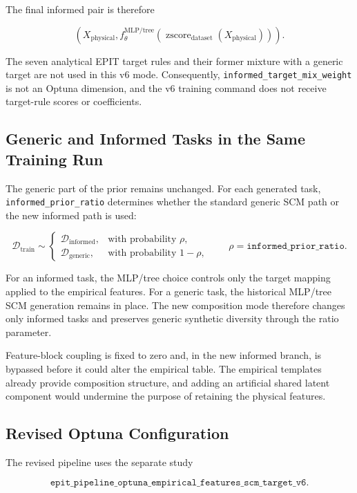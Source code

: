 \documentclass{article}
\begin{document}
The final informed pair is therefore

\[
\left(
X_{\mathrm{physical}},
f_{\theta}^{\mathrm{MLP/tree}}
\!\left(
\operatorname{zscore}_{\mathrm{dataset}}
(X_{\mathrm{physical}})
\right)
\right).
\]

The seven analytical EPIT target rules and their former mixture with a generic
target are not used in this v6 mode. Consequently,
\texttt{informed\_target\_mix\_weight} is not an Optuna dimension, and the
v6 training command does not receive target-rule scores or coefficients.

\subsection{Generic and Informed Tasks in the Same Training Run}

The generic part of the prior remains unchanged. For each generated task,
\texttt{informed\_prior\_ratio} determines whether the standard generic SCM
path or the new informed path is used:

\[
\mathcal{D}_{\mathrm{train}}
\sim
\begin{cases}
\mathcal{D}_{\mathrm{informed}},
& \text{with probability }\rho,\\
\mathcal{D}_{\mathrm{generic}},
& \text{with probability }1-\rho,
\end{cases}
\qquad
\rho
=
\texttt{informed\_prior\_ratio}.
\]

For an informed task, the MLP/tree choice controls only the target mapping
applied to the empirical features. For a generic task, the historical MLP/tree
SCM generation remains in place. The new composition mode therefore changes
only informed tasks and preserves generic synthetic diversity through the
ratio parameter.

Feature-block coupling is fixed to zero and, in the new informed branch, is
bypassed before it could alter the empirical table. The empirical templates
already provide composition structure, and adding an artificial shared latent
component would undermine the purpose of retaining the physical features.

\subsection{Revised Optuna Configuration}

The revised pipeline uses the separate study

\[
\texttt{epit\_pipeline\_optuna\_empirical\_features\_scm\_target\_v6}.
\]
\end{document}
